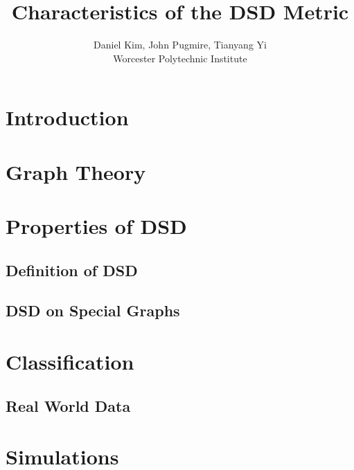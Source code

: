 \documentclass[11pt,oneside]{report}
\theoremstyle{definition}
\begin{document}
\title{Characteristics of the DSD Metric}
\author{Daniel Kim, John Pugmire, Tianyang Yi\\Worcester Polytechnic Institute\\}
\maketitle
\tableofcontents


\chapter{Introduction}

\chapter{Graph Theory}




\chapter{Properties of DSD}
\section{Definition of DSD}


\section{DSD on Special Graphs}



\chapter{Classification}

\section{Real World Data}


\chapter{Simulations}
\end{document}
